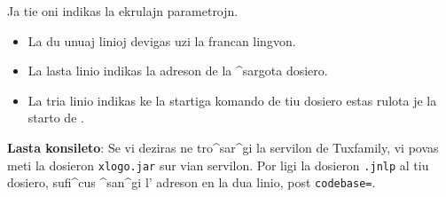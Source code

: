 Ja tie oni indikas la ekrulajn parametrojn.
\begin{itemize}
\item La du unuaj linioj devigas uzi la francan lingvon.
\item La lasta linio indikas la adreson de la ^sargota dosiero.
\item La tria linio indikas ke la startiga komando de tiu dosiero
  estas rulota je la starto de \xlogo{}.
\end{itemize}
\vspace{0.5cm} \textbf{Lasta konsileto}: Se vi deziras ne tro^sar^gi
la servilon de Tuxfamily, vi povas meti la dosieron \texttt{xlogo.jar}
sur vian servilon.  Por ligi la dosieron \texttt{.jnlp} al tiu
dosiero, sufi^cus ^san^gi l' adreson en la dua linio, post
\texttt{codebase=}.

